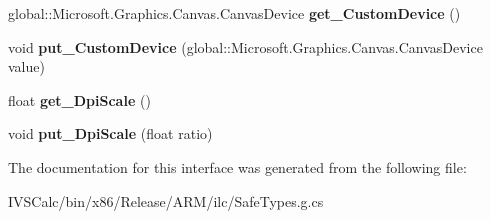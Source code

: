 \begin{DoxyCompactItemize}
global\+::\+Microsoft.\+Graphics.\+Canvas.\+Canvas\+Device {\bfseries get\+\_\+\+Custom\+Device} ()
\item 
\mbox{\label{interface_microsoft_1_1_graphics_1_1_canvas_1_1_u_i_1_1_xaml_1_1_i_canvas_animated_control_a1ed79cdec8e4db44f9bde6eea87fac53}} 
void {\bfseries put\+\_\+\+Custom\+Device} (global\+::\+Microsoft.\+Graphics.\+Canvas.\+Canvas\+Device value)
\item 
\mbox{\label{interface_microsoft_1_1_graphics_1_1_canvas_1_1_u_i_1_1_xaml_1_1_i_canvas_animated_control_a8e858555a2d0715c9b9885272b85946f}} 
float {\bfseries get\+\_\+\+Dpi\+Scale} ()
\item 
\mbox{\label{interface_microsoft_1_1_graphics_1_1_canvas_1_1_u_i_1_1_xaml_1_1_i_canvas_animated_control_a3434abed58869d5f025b85596f8a92a0}} 
void {\bfseries put\+\_\+\+Dpi\+Scale} (float ratio)
\end{DoxyCompactItemize}


The documentation for this interface was generated from the following file\+:\begin{DoxyCompactItemize}
\item 
I\+V\+S\+Calc/bin/x86/\+Release/\+A\+R\+M/ilc/Safe\+Types.\+g.\+cs\end{DoxyCompactItemize}
